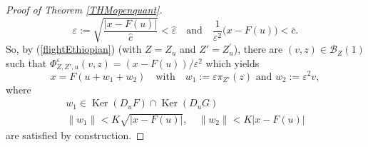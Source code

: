 \documentclass[JEP,XML,SOM,Unicode,NoFloatCountersInSection,published]{cedram}
\let\epsilon\varepsilon
\DeclareMathOperator{\Ker}{Ker}
\theoremstyle{definition}
\begin{document}
\begin{proof}[Proof of Theorem \ref{THMopenquant}]
\[
\epsilon:= \sqrt{ \frac{|x-F(u)|}{\hat{c}}} < \hat{\epsilon} \quad \text{and} \quad \frac{1}{\epsilon^2} \bigl(x-F(u)\bigr) < \bar{c}.
\]
So, by (\ref{flightEthiopian}) (with $Z=Z_{u}$ and $Z'=Z^{\prime}_{u}$), there are $(v,z)\in \mathcal{B}_Z(1)$ such that $ \Phi_{Z,Z',u}^{\epsilon} (v,z)=(x-F(u))/\epsilon^2$ which yields
\[
x=F(u+w_1+w_2) \quad \text{with} \quad w_1:=\epsilon \pi_{Z'}(z) \text{ and } w_2:= \epsilon^2 v,
\]
where
\begin{gather*}
w_1 \in \Ker\left(D_uF\right) \cap \Ker\left(D_uG\right)
\\
\tag*{and} \|w_1\|<K \sqrt{|x-F(u)|}, \quad \|w_2\|<K |x-F(u)|
\end{gather*}
are satisfied by construction.
\end{proof}

\backmatter


\end{document}
